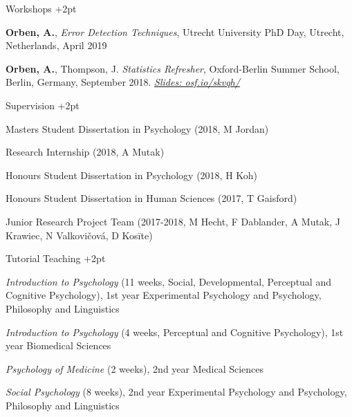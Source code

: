\documentclass{resume} %
\begin{document}
\begin{rSection}{Workshops} \itemsep +2pt

\item \textbf{Orben, A.}, \textit{Error Detection Techniques}, Utrecht University PhD Day, Utrecht, Netherlands, April 2019

\item \textbf{Orben, A.}, Thompson, J. \textit{Statistics Refresher}, Oxford-Berlin Summer School, Berlin, Germany, September 2018. \textit{{\href{https://osf.io/skvqh/}{Slides: osf.io/skvqh/}}}

\end{rSection}

\begin{rSection}{Supervision} \itemsep +2pt

\item Masters Student Dissertation in Psychology (2018, M Jordan)

\item Research Internship (2018, A Mutak)

\item Honours Student Dissertation in Psychology (2018, H Koh)

\item Honours Student Dissertation in Human Sciences (2017, T Gaisford)

\item Junior Research Project Team (2017-2018, M Hecht, F Dablander, A Mutak, J Krawiec, N Valkovičová, D Kosīte)

\end{rSection}

\begin{rSection}{Tutorial Teaching} \itemsep +2pt

\item \textit{Introduction to Psychology} (11 weeks, Social, Developmental, Perceptual and Cognitive Psychology), 1st year Experimental Psychology and Psychology, Philosophy and Linguistics 

\item \textit{Introduction to Psychology} (4 weeks, Perceptual and Cognitive Psychology), 1st year Biomedical Sciences 

\item \textit{Psychology of Medicine} (2 weeks), 2nd year Medical Sciences 

\item \textit{Social Psychology} (8 weeks), 2nd year Experimental Psychology and Psychology, Philosophy and Linguistics

\end{rSection}
\end{document}
